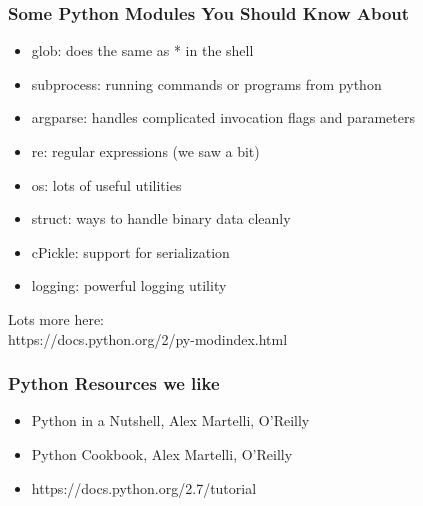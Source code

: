 \documentclass[10pt]{beamer}
\begin{document}
\begin{frame}[fragile]
\frametitle{Some Python Modules You Should Know About}

\begin{itemize}
\item glob: does the same as * in the shell
\item subprocess: running commands or programs from python
\item argparse: handles complicated invocation flags and parameters
\item re: regular expressions (we saw a bit)
\item os: lots of useful utilities
\item struct: ways to handle binary data cleanly
\item cPickle: support for serialization
\item logging: powerful logging utility
\end{itemize}

\vspace{5mm}
Lots more here:\\
https://docs.python.org/2/py-modindex.html

\end{frame}

\begin{frame}[fragile]
\frametitle{Python Resources we like}

\begin{itemize}
\item Python in a Nutshell, Alex Martelli, O'Reilly
\item Python Cookbook, Alex Martelli, O'Reilly
\item https://docs.python.org/2.7/tutorial
\end{itemize}

\end{frame}
\end{document}

